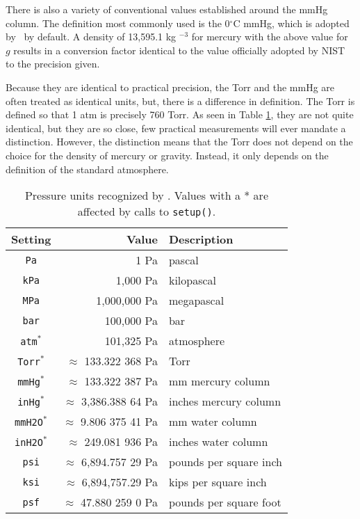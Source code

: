 There is also a variety of conventional values established around the mmHg column.  The definition most commonly used is the 0$^\circ$C mmHg, which is adopted by \PM\ by default.  A density of 13,595.1 kg $^{-3}$ for mercury with the above value for $g$ results in a conversion factor identical to the value officially adopted by NIST \cite[p.52]{nist:sp811} to the precision given.

Because they are identical to practical precision, the Torr and the mmHg are often treated as identical units, but, there is a difference in definition.  The Torr is defined so that 1 atm is precisely 760 Torr.  As seen in Table \ref{tab:pressure}, they are not quite identical, but they are so close, few practical measurements will ever mandate a distinction.  However, the distinction means that the Torr does not depend on the choice for the density of mercury or gravity.  Instead, it only depends on the definition of the standard atmosphere.

\begin{table}
\centering
\caption{Pressure units recognized by \PM. Values with a * are affected by calls to \texttt{setup()}.}\label{tab:pressure}
\begin{tabular}{crl}
\hline
Setting & Value & Description\\
\hline
\verb|Pa| & 1 Pa & pascal\\
\verb|kPa| & 1,000 Pa & kilopascal\\
\verb|MPa| & 1,000,000 Pa & megapascal\\
\verb|bar| & 100,000 Pa & bar\\
\verb|atm|$^*$ & 101,325 Pa & atmosphere\\
\verb|Torr|$^*$ & $\approx$ 133.322 368 Pa & Torr\\
\verb|mmHg|$^*$ & $\approx$ 133.322 387 Pa & mm mercury column\\
\verb|inHg|$^*$ & $\approx$ 3,386.388 64 Pa & inches mercury column\\
\verb|mmH2O|$^*$ & $\approx$ 9.806 375 41 Pa & mm water column\\
\verb|inH2O|$^*$ & $\approx$ 249.081 936 Pa & inches water column\\
\verb|psi| & $\approx$ 6,894.757 29 Pa & pounds per square inch\\
\verb|ksi| & $\approx$ 6,894,757.29 Pa & kips per square inch\\
\verb|psf| & $\approx$ 47.880 259 0 Pa & pounds per square foot\\
\hline
\end{tabular}
\end{table}

